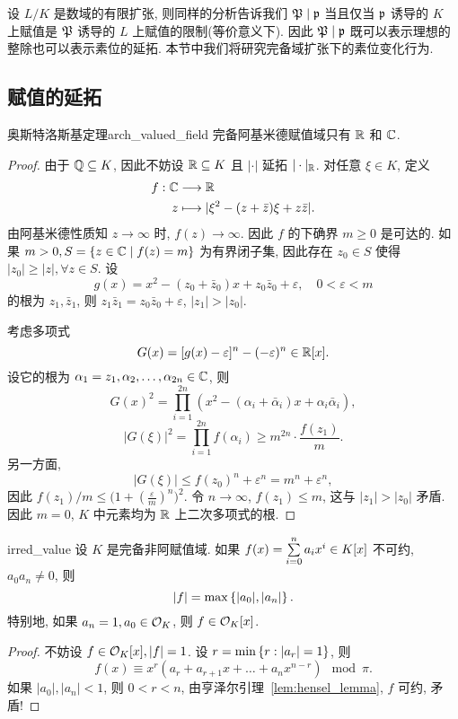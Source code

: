 设 $L/K$ 是数域的有限扩张, 则同样的分析告诉我们 ${\mathfrak{P}}\mid {\mathfrak{p}}$ 当且仅当 ${\mathfrak{p}}$ 诱导的 $K$ 上赋值是 ${\mathfrak{P}}$ 诱导的 $L$ 上赋值的限制(等价意义下). 因此 ${\mathfrak{P}}\mid {\mathfrak{p}}$ 既可以表示理想的整除也可以表示素位的延拓.
本节中我们将研究完备域扩张下的素位变化行为.


\subsection{赋值的延拓}
\begin{theorem}{奥斯特洛斯基定理}{arch_valued_field}
完备阿基米德赋值域只有 ${\mathbb{R}}$ 和 ${\mathbb{C}}$.
\end{theorem}
\begin{proof}
由于 ${\mathbb{Q}}\subseteq K$, 因此不妨设 ${\mathbb{R}}\subseteq K$ 且 $|\cdot|$ 延拓  $|\cdot|_{\mathbb{R}}$. 对任意 $\xi\in K$, 定义
  \[\begin{split}f:{\mathbb{C}} &\longrightarrow {\mathbb{R}} \\ z &\longmapsto |\xi^2-(z+\bar z)\xi+z\bar z|.\end{split}\]
由阿基米德性质知 $z\to \infty$ 时, $f(z)\to \infty$. 因此 $f$ 的下确界 $m\ge 0$ 是可达的. 如果 $m>0, S=\left\{z\in{\mathbb{C}}\mid f(z)=m\right\}$ 为有界闭子集, 因此存在 $z_0\in S$ 使得 $|z_0|\ge |z|,\forall z\in S$. 设 
  \[g(x)=x^2-(z_0+\bar z_0)x+z_0 \bar z_0+\varepsilon,\quad 0<\varepsilon<m\]
的根为 $z_1,\bar z_1$, 则 $z_1\bar z_1=z_0\bar z_0+\varepsilon$, $|z_1|>|z_0|$.

考虑多项式
  \[G(x)=[g(x)-\varepsilon]^n-(-\varepsilon)^n\in {\mathbb{R}}[x].\]
设它的根为 $\alpha_1=z_1,\alpha_2,\dots,\alpha_{2n}\in {\mathbb{C}}$, 则
  \[G(x)^2=\prod_{i=1}^{2n}(x^2-(\alpha_i+\bar\alpha_i)x+\alpha_i\bar\alpha_i),\]
  \[|G(\xi)|^2=\prod_{i=1}^{2n}f(\alpha_i)\ge m^{2n}\cdot \frac{f(z_1)}{m}.\]
另一方面,
  \[|G(\xi)|\le f(z_0)^n+\varepsilon^n=m^n+\varepsilon^n,\]
因此 $f(z_1)/m\le\bigl(1+(\frac{\varepsilon}{m})^n\bigr)^2$. 令 $n\to \infty$, $f(z_1)\le m$, 这与 $|z_1|>|z_0|$ 矛盾. 因此 $m=0$, $K$ 中元素均为 ${\mathbb{R}}$ 上二次多项式的根.
\end{proof}

\begin{proposition}{}{irred_value}
设 $K$ 是完备非阿赋值域. 如果 $f(x)=\sum\limits_{i=0}^n a_i x^i\in K[x]$ 不可约, $a_0a_n\neq 0$, 则
  \[ |f|=\max\left\{|a_0|,|a_n|\right\}.\]
特别地, 如果 $a_n=1,a_0\in{\mathcal{O}}_K$, 则 $f\in{\mathcal{O}}_K[x]$.
\end{proposition}
\begin{proof}
不妨设 $f\in{\mathcal{O}}_K[x],|f|=1$. 设 $r=\min\left\{r: |a_r|=1\right\}$, 则
  \[f(x)\equiv x^r(a_r+a_{r+1}x+\dots+a_nx^{n-r})\mod \pi.\]
如果 $|a_0|,|a_n|<1$, 则 $0<r<n$, 由亨泽尔引理~\ref{lem:hensel_lemma}, $f$ 可约, 矛盾!
\end{proof}

